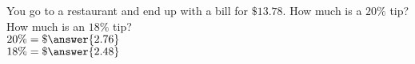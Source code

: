 \documentclass{ximera}
\author{David Kish}
\begin{document}
  \begin{exercise}
 You go to a restaurant and end up with a bill for $\$13.78$.  How much is a $20\% $ tip?  How much is an $18\% $ tip?\\
$ 20\% = \$\answer{2.76}$\\
 $18\% = \$\answer {2.48}$ \calcHW
 \end{exercise}
\end{document}
